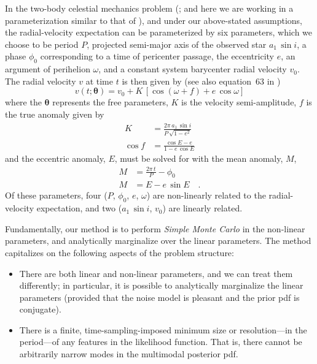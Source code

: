 \documentclass[manuscript, letterpaper]{aastex6}
\newcommand{\asini}{\ensuremath{a_1\,\sin i}}
\newcommand{\bs}[1]{\boldsymbol{#1}}
\begin{document}
In the two-body celestial mechanics problem (\citealt{Kepler:1609}; and here we
are working in a parameterization similar to that of \citealt{Murray:2010}), and
under our above-stated assumptions, the radial-velocity expectation can be
parameterized by six parameters, which we choose to be period $P$, projected
semi-major axis of the observed star $\asini$, a phase $\phi_0$ corresponding to
a time of pericenter passage, the eccentricity $e$, an argument of perihelion
$\omega$, and a constant system barycenter radial velocity $v_0$.
The radial velocity $v$ at time $t$ is then given by (see also
equation~63 in \citealt{Murray:2010})
\begin{equation}
  v(t;\bs{\theta}) = v_0 + K\,[\cos(\omega + f) + e\,\cos\omega]
\end{equation}
where the $\bs{\theta}$ represents the free parameters, $K$ is the velocity
semi-amplitude, $f$ is the true anomaly given by
\begin{align}
  K &= \frac{2\pi\,\asini}{P\,\sqrt{1-e^2}}\\
  \cos f &= \frac{\cos E - e}{1 - e\, \cos E}
\end{align}
and the eccentric anomaly, $E$, must be solved for with the mean
anomaly, $M$,
\begin{align}
  M &= \frac{2\pi\, t}{P} - \phi_0\\
  M &= E - e\,\sin E \quad .
\end{align}
Of these parameters, four ($P$, $\phi_0$, $e$, $\omega$) are
non-linearly related to the radial-velocity expectation, and two
($\asini$, $v_0$) are linearly related.

Fundamentally, our method is to perform \emph{Simple Monte Carlo} in
the non-linear parameters, and analytically marginalize over the linear
parameters.
The method capitalizes on the following aspects of the problem
structure:
\begin{itemize}
\item There are both linear and non-linear parameters, and we can
  treat them differently; in particular, it is possible to
  analytically marginalize the linear parameters (provided that the
  noise model is pleasant and the prior pdf is conjugate).
\item There is a finite, time-sampling-imposed minimum size or
  resolution---in the period---of any features in the
  likelihood function. That is, there cannot be arbitrarily narrow
  modes in the multimodal posterior pdf.
\end{itemize}
\end{document}
